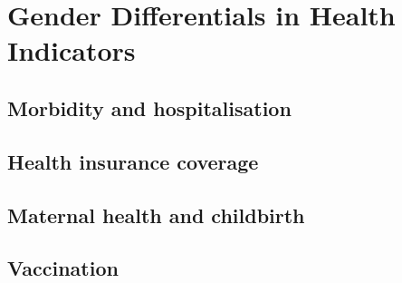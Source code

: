 \section{Gender Differentials in Health Indicators}
\subsection{Morbidity and hospitalisation}
\subsection{Health insurance coverage}
\subsection{Maternal health and childbirth}
\subsection{Vaccination}